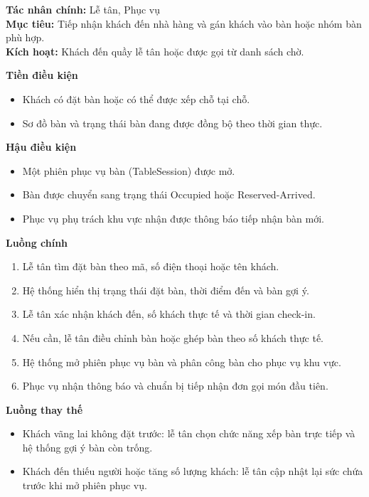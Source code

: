 \documentclass[11pt,a4paper]{article}
\begin{document}
    \begin{usecasebox}[title={UC-RES-02 --- Nhận khách và sắp bàn}]
    \textbf{Tác nhân chính:} Lễ tân, Phục vụ\\
    \textbf{Mục tiêu:} Tiếp nhận khách đến nhà hàng và gán khách vào bàn hoặc nhóm bàn phù hợp.\\
    \textbf{Kích hoạt:} Khách đến quầy lễ tân hoặc được gọi từ danh sách chờ.

    \medskip
    \textbf{Tiền điều kiện}
    \begin{itemize}[leftmargin=1.8em]
  \item Khách có đặt bàn hoặc có thể được xếp chỗ tại chỗ.
  \item Sơ đồ bàn và trạng thái bàn đang được đồng bộ theo thời gian thực.
\end{itemize}

    \textbf{Hậu điều kiện}
    \begin{itemize}[leftmargin=1.8em]
  \item Một phiên phục vụ bàn (\textsf{TableSession}) được mở.
  \item Bàn được chuyển sang trạng thái \textsf{Occupied} hoặc \textsf{Reserved-Arrived}.
  \item Phục vụ phụ trách khu vực nhận được thông báo tiếp nhận bàn mới.
\end{itemize}

    \textbf{Luồng chính}
    \begin{enumerate}[leftmargin=1.8em]
  \item Lễ tân tìm đặt bàn theo mã, số điện thoại hoặc tên khách.
  \item Hệ thống hiển thị trạng thái đặt bàn, thời điểm đến và bàn gợi ý.
  \item Lễ tân xác nhận khách đến, số khách thực tế và thời gian check-in.
  \item Nếu cần, lễ tân điều chỉnh bàn hoặc ghép bàn theo số khách thực tế.
  \item Hệ thống mở phiên phục vụ bàn và phân công bàn cho phục vụ khu vực.
  \item Phục vụ nhận thông báo và chuẩn bị tiếp nhận đơn gọi món đầu tiên.
\end{enumerate}

    \textbf{Luồng thay thế}
    \begin{itemize}[leftmargin=1.8em]
  \item Khách vãng lai không đặt trước: lễ tân chọn chức năng xếp bàn trực tiếp và hệ thống gợi ý bàn còn trống.
  \item Khách đến thiếu người hoặc tăng số lượng khách: lễ tân cập nhật lại sức chứa trước khi mở phiên phục vụ.
\end{itemize}


\end{usecasebox}
\end{document}
